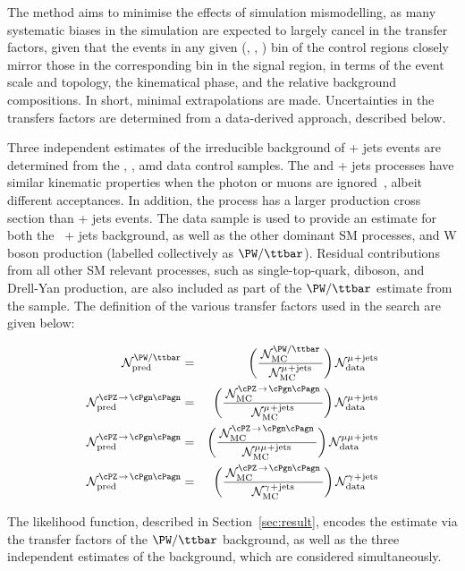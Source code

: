 The method aims to minimise the effects of simulation mismodelling, as
many systematic biases in the simulation are expected to largely
cancel in the transfer factors, given that the events in any given
(\njet, \nb, \scalht) bin of the control regions closely mirror those
in the corresponding bin in the signal region, in terms of the event
scale and topology, the kinematical phase, and the relative background
compositions. In short, minimal extrapolations are made. Uncertainties
in the transfers factors are determined from a data-derived approach,
described below.

Three independent estimates of the irreducible background of \znunu +
jets events are determined from the \gj, \mmj, amd \mj data control
samples. The \gj and \zmumu + jets processes have similar kinematic
properties when the photon or muons are ignored~\cite{Bern:2011pa},
albeit different acceptances. In addition, the \gj process has a
larger production cross section than \znunu + jets events. The \mj
data sample is used to provide an estimate for both the \znunu\ + jets
background, as well as the other dominant SM processes, \ttbar and W
boson production (labelled collectively as $\PW/\ttbar$). Residual
contributions from all other SM relevant processes, such as
single-top-quark, diboson, and Drell-Yan production, are also included
as part of the $\PW/\ttbar$ estimate from the \mj sample. The
definition of the various transfer factors used in the search are
given below:

\begin{eqnarray} 
  \mathcal{N}^\text{\PW/\ttbar}_\text{pred} & = & 
  \bigg( 
  \frac{\,\mathcal{N}^\text{\PW/\ttbar}_\text{MC}\,}
  {\mathcal{N}^\text{\mj}_\text{MC}}
  \bigg)\,
  \mathcal{N}^\text{\mj}_\text{data} \\
  \mathcal{N}^\text{\znunu}_\text{pred} & = & 
  \bigg( 
  \frac{\,\mathcal{N}^\text{\znunu}_\text{MC}\,}
  {\mathcal{N}^\text{\mj}_\text{MC}}
  \bigg)\,
  \mathcal{N}^\text{\mj}_\text{data} \\
  \mathcal{N}^\text{\znunu}_\text{pred} & = & 
  \bigg( 
  \frac{\,\mathcal{N}^\text{\znunu}_\text{MC}\,}
  {\mathcal{N}^\text{\mmj}_\text{MC}}
  \bigg)\,
  \mathcal{N}^\text{\mmj}_\text{data} \\
  \mathcal{N}^\text{\znunu}_\text{pred} & = & 
  \bigg( 
  \frac{\,\mathcal{N}^\text{\znunu}_\text{MC}\,}
  {\mathcal{N}^\text{\gj}_\text{MC}}
  \bigg)\,
  \mathcal{N}^\text{\gj}_\text{data} 
\end{eqnarray} 

The likelihood function, described in Section~\ref{sec:result},
encodes the estimate via the transfer factors of the $\PW/\ttbar$
background, as well as the three independent estimates of the \znunu
background, which are considered simultaneously.

